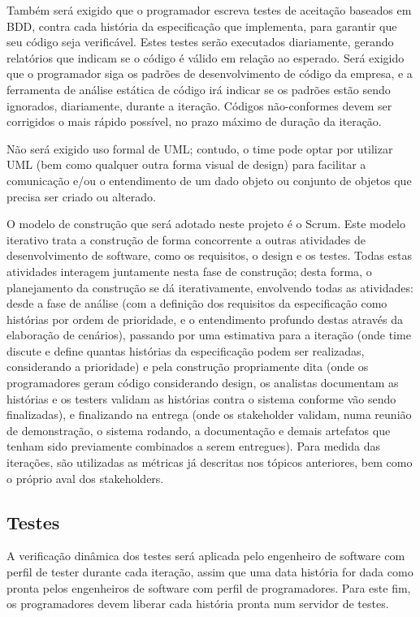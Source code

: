 \documentclass[12pt,journal,compsoc]{IEEEtran}
\begin{document}
Também será exigido que o programador escreva testes de aceitação baseados em BDD, contra cada história da especificação que implementa, para garantir que seu código seja verificável. Estes testes serão executados diariamente, gerando relatórios que indicam se o código é válido em relação ao esperado. Será exigido que o programador siga os padrões de desenvolvimento de código da empresa, e a ferramenta de análise estática de código irá indicar se os padrões estão sendo ignorados, diariamente, durante a iteração. Códigos não-conformes devem ser corrigidos o mais rápido possível, no prazo máximo de duração da iteração.

Não será exigido uso formal de UML; contudo, o time pode optar por utilizar UML (bem como qualquer outra forma visual de design) para facilitar a comunicação e/ou o entendimento de um dado objeto ou conjunto de objetos que precisa ser criado ou alterado. 

O modelo de construção que será adotado neste projeto é o Scrum. Este modelo iterativo trata a construção de forma concorrente a outras atividades de desenvolvimento de software, como os requisitos, o design e os testes. Todas estas atividades interagem juntamente nesta fase de construção; desta forma, o planejamento da construção se dá iterativamente, envolvendo todas as atividades: desde a fase de análise (com a definição dos requisitos da especificação como histórias por ordem de prioridade, e o entendimento profundo destas através da elaboração de cenários), passando por  uma estimativa para a iteração (onde time discute e define quantas histórias da especificação podem ser realizadas, considerando a prioridade) e pela construção propriamente dita (onde os programadores geram código considerando design, os analistas documentam as histórias e os testers validam as histórias contra o sistema conforme vão sendo finalizadas), e finalizando na entrega (onde os stakeholder validam, numa reunião de demonstração, o sistema rodando, a documentação e demais artefatos que tenham sido previamente combinados a serem entregues). Para medida das iterações, são utilizadas as métricas já descritas nos tópicos anteriores, bem como o próprio aval dos stakeholders.


\subsection{Testes}

A verificação dinâmica dos testes será aplicada pelo engenheiro de software com perfil de tester durante cada iteração, assim que uma data história for dada como pronta pelos engenheiros de software com perfil de programadores. Para este fim, os programadores devem liberar cada história pronta num servidor de testes.
\end{document}
